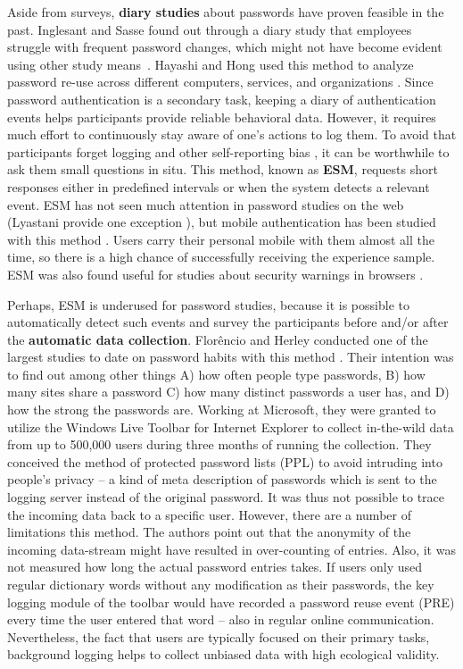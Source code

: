 Aside from surveys, \textbf{diary studies} about passwords have proven feasible in the past. Inglesant and Sasse found out through a diary study that employees struggle with frequent password changes, which might not have become evident using other study means \cite{Inglesant2010TrueCostOfUnusablePolicies}. Hayashi and Hong used this method to analyze password re-use across different computers, services, and organizations \cite{Hayashi2011DiaryStudyPWs}. Since password authentication is a secondary task, keeping a diary of authentication events helps participants provide reliable behavioral data. However, it requires much effort to continuously stay aware of one's actions to log them. To avoid that participants forget logging and other self-reporting bias \cite{Wash2017SelfReport}, it can be worthwhile to ask them small questions in situ. This method, known as \textbf{\gls{ESM}}, requests short responses either in predefined intervals or when the system detects a relevant event. ESM has not seen much attention in password studies on the web (Lyastani \etal provide one exception \cite{Lyastani2017ImpactPWMPasswordStrength}), but mobile authentication has been studied with this method \cite{Harbach2016HardLockLife}. Users carry their personal mobile with them almost all the time, so there is a high chance of successfully receiving the experience sample. ESM was also found useful for studies about security warnings in browsers \cite{Akhawe2013AliceInWarningland,Felt2016RethinkingConnectionSecurityIndicators}.

Perhaps, ESM is underused for password studies, because it is possible to automatically detect such events and survey the participants before and/or after the \textbf{automatic data collection}. Florêncio and Herley conducted one of the largest studies to date on password habits with this method \cite{Florencio2007LargeScaleStudyPasswordHabits}. Their intention was to find out among other things A) how often people type passwords, B) how many sites share a password C) how many distinct passwords a user has, and D) how the strong the passwords are. Working at Microsoft, they were granted to utilize the Windows Live Toolbar for Internet Explorer to collect in-the-wild data from up to 500,000 users during three months of running the collection. They conceived the method of protected password lists (PPL) to avoid intruding into people's privacy -- a kind of meta description of passwords which is sent to the logging server instead of the original password. It was thus not possible to trace the incoming data back to a specific user. However, there are a number of limitations this method. The authors point out that the anonymity of the incoming data-stream might have resulted in over-counting of entries. Also, it was not measured how long the actual password entries takes. If users only used regular dictionary words without any modification as their passwords, the key logging module of the toolbar would have recorded a password reuse event (PRE) every time the user entered that word -- also in regular online communication. Nevertheless, the fact that users are typically focused on their primary tasks, background logging helps to collect unbiased data with high ecological validity. 

